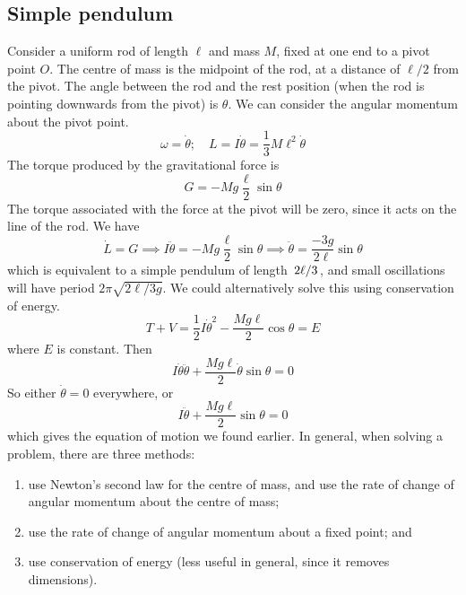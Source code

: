 \subsection{Simple pendulum}
Consider a uniform rod of length \(\ell\) and mass \(M\), fixed at one end to a pivot point \(O\).
The centre of mass is the midpoint of the rod, at a distance of \(\ell/2\) from the pivot.
The angle between the rod and the rest position (when the rod is pointing downwards from the pivot) is \(\theta\).
We can consider the angular momentum about the pivot point.
\[
	\omega = \dot\theta;\quad L = I \dot\theta = \frac{1}{3}M\ell^2 \dot\theta
\]
The torque produced by the gravitational force is
\[
	G = -Mg \frac{\ell}{2}\sin\theta
\]
The torque associated with the force at the pivot will be zero, since it acts on the line of the rod.
We have
\[
	\dot L = G \implies I\ddot\theta = -Mg\frac{\ell}{2}\sin\theta \implies \ddot\theta = \frac{-3g}{2\ell}\sin\theta
\]
which is equivalent to a simple pendulum of length \(\flatfrac{2\ell}{3}\), and small oscillations will have period \(2\pi\sqrt{2\ell/3g}\).
We could alternatively solve this using conservation of energy.
\[
	T + V = \frac{1}{2}I\dot\theta^2 - \frac{Mg\ell}{2}\cos\theta = E
\]
where \(E\) is constant.
Then
\[
	I\dot\theta\ddot\theta + \frac{Mg\ell}{2}\dot\theta\sin\theta = 0
\]
So either \(\dot\theta = 0\) everywhere, or
\[
	I\ddot\theta + \frac{Mg\ell}{2}\sin\theta = 0
\]
which gives the equation of motion we found earlier.
In general, when solving a problem, there are three methods:
\begin{enumerate}
	\item use Newton's second law for the centre of mass, and use the rate of change of angular momentum about the centre of mass;
	\item use the rate of change of angular momentum about a fixed point; and
	\item use conservation of energy (less useful in general, since it removes dimensions).
\end{enumerate}

